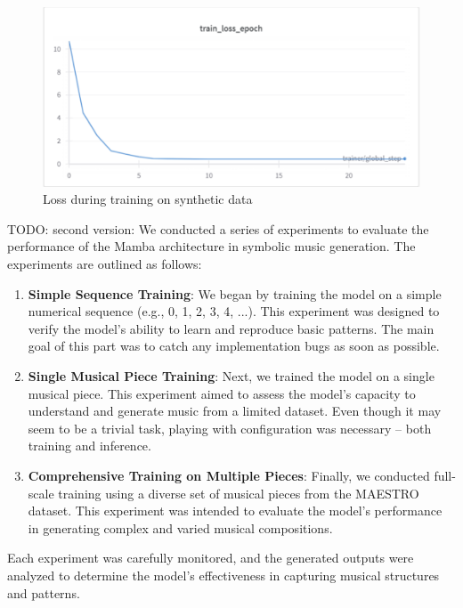 \documentclass[conference,compsoc]{IEEEtran}
\begin{document}
\begin{figure}[!htbp]
    \centering \includegraphics[width=\linewidth]{../assets/synth_data_train.png}
    \caption{ Loss during training on synthetic data}
    \label{fig:synth}
\end{figure}

TODO: second version:
We conducted a series of experiments to evaluate the performance of the Mamba architecture in symbolic music generation. The experiments are outlined as follows:

\begin{enumerate}
    \item \textbf{Simple Sequence Training}: We began by training the model on a simple numerical sequence (e.g., 0, 1, 2, 3, 4, ...). This experiment was designed to verify the model's ability to learn and reproduce basic patterns. The main goal of this part was to catch any implementation bugs as soon as possible.

    \item \textbf{Single Musical Piece Training}: Next, we trained the model on a single musical piece. This experiment aimed to assess the model's capacity to understand and generate music from a limited dataset. Even though it may seem to be a trivial task, playing with configuration was necessary – both training and inference.

    \item \textbf{Comprehensive Training on Multiple Pieces}: Finally, we conducted full-scale training using a diverse set of musical pieces from the MAESTRO dataset. This experiment was intended to evaluate the model's performance in generating complex and varied musical compositions.
\end{enumerate}

Each experiment was carefully monitored, and the generated outputs were analyzed to determine the model's effectiveness in capturing musical structures and patterns.
\end{document}
